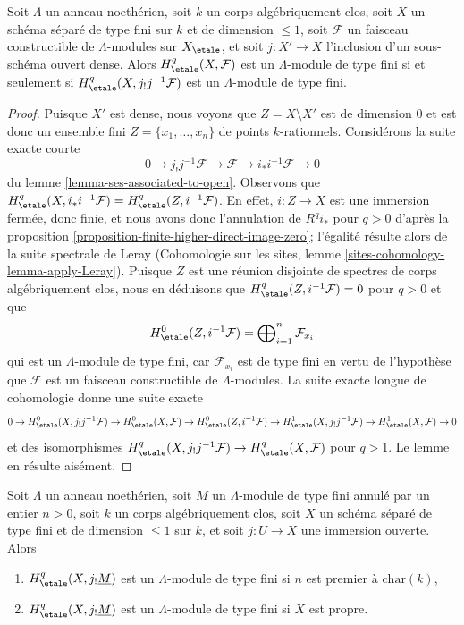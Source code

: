 \begin{lemma}
\label{lemma-restrict-to-open-coefficients}
Soit $\Lambda$ un anneau noethérien, soit $k$ un corps algébriquement clos,
soit $X$ un schéma séparé de type fini sur $k$ et de dimension $\leq 1$,
soit $\mathcal{F}$ un faisceau constructible de $\Lambda$-modules sur $X_\etale$,
et soit $j : X' \to X$ l'inclusion d'un sous-schéma ouvert dense. Alors
$H^q_\etale(X, \mathcal{F})$ est un $\Lambda$-module de type fini si et seulement si
$H^q_\etale(X, j_!j^{-1}\mathcal{F})$ est un $\Lambda$-module de type fini.
\end{lemma}

\begin{proof}
Puisque $X'$ est dense, nous voyons que $Z = X \setminus X'$ est de dimension $0$
et est donc un ensemble fini $Z = \{x_1, \ldots, x_n\}$ de points $k$-rationnels.
Considérons la suite exacte courte
$$
0 \to j_!j^{-1}\mathcal{F} \to \mathcal{F} \to i_*i^{-1}\mathcal{F} \to 0
$$
du lemme \ref{lemma-ses-associated-to-open}. Observons que
$H^q_\etale(X, i_*i^{-1}\mathcal{F}) = H^q_\etale(Z, i^{-1}\mathcal{F})$.
En effet, $i : Z \to X$ est une immersion fermée, donc finie,
et nous avons donc l'annulation de $R^qi_*$ pour $q > 0$ d'après la
proposition \ref{proposition-finite-higher-direct-image-zero};
l'égalité résulte alors de la suite spectrale de Leray
(Cohomologie sur les sites, lemme \ref{sites-cohomology-lemma-apply-Leray}).
Puisque $Z$ est une réunion disjointe de spectres de corps algébriquement
clos, nous en déduisons que $H^q_\etale(Z, i^{-1}\mathcal{F}) = 0$
pour $q > 0$ et que
$$
H^0_\etale(Z, i^{-1}\mathcal{F}) =
\bigoplus\nolimits_{i=1}^n \mathcal{F}_{x_i}
$$
qui est un $\Lambda$-module de type fini, car $\mathcal{F}_{x_i}$ est de type fini en vertu de
l'hypothèse que $\mathcal{F}$ est un faisceau constructible de $\Lambda$-modules.
La suite exacte longue de cohomologie donne une suite exacte
$$
0 \to
H^0_\etale(X, j_!j^{-1}\mathcal{F}) \to
H^0_\etale(X, \mathcal{F}) \to
H^0_\etale(Z, i^{-1}\mathcal{F}) \to
H^1_\etale(X, j_!j^{-1}\mathcal{F}) \to
H^1_\etale(X, \mathcal{F}) \to 0
$$
et des isomorphismes $H^q_\etale(X, j_!j^{-1}\mathcal{F}) \to
H^q_\etale(X, \mathcal{F})$ pour $q > 1$. Le lemme en résulte aisément.
\end{proof}

\begin{lemma}
\label{lemma-somewhat-easier-coefficients}
Soit $\Lambda$ un anneau noethérien, soit $M$ un $\Lambda$-module de type fini annulé
par un entier $n > 0$, soit $k$ un corps algébriquement clos, soit $X$ un
schéma séparé de type fini et de dimension $\leq 1$ sur $k$, et soit
$j : U \to X$ une immersion ouverte. Alors
\begin{enumerate}
\item $H^q_\etale(X, j_!\underline{M})$ est un $\Lambda$-module de type fini
si $n$ est premier à $\text{char}(k)$,
\item $H^q_\etale(X, j_!\underline{M})$ est un $\Lambda$-module de type fini
si $X$ est propre.
\end{enumerate}
\end{lemma}


